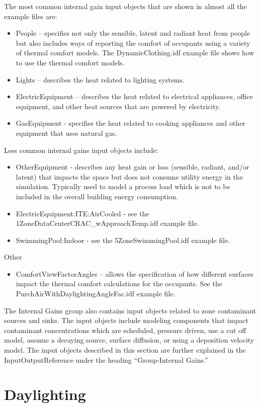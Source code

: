 The most common internal gain input objects that are shown in almost
all the example files are:
\begin{itemize}
\item People -- specifies not only the sensible, latent and radiant heat
from people but also includes ways of reporting the comfort of occupants
using a variety of thermal comfort models. The DynamicClothing.idf
example file shows how to use the thermal comfort models.
\item Lights -- describes the heat related to lighting systems.
\item ElectricEquipment -- describes the heat related to electrical appliances,
office equipment, and other heat sources that are powered by electricity.
\item GasEquipment - specifies the heat related to cooking appliances and
other equipment that uses natural gas.
\end{itemize}
Less common internal gains input objects include:
\begin{itemize}
\item OtherEquipment - describes any heat gain or loss (sensible, radiant,
and/or latent) that impacts the space but does not consume utility
energy in the simulation. Typically used to model a process load which
is not to be included in the overall building energy consumption.
\item ElectricEquipment:ITE:AirCooled - see the 1ZoneDataCenterCRAC\_wApproachTemp.idf
example file.
\item SwimmingPool:Indoor - see the 5ZoneSwimmingPool.idf example file.
\end{itemize}
Other
\begin{itemize}
\item ComfortViewFactorAngles -- allows the specification of how different
surfaces impact the thermal comfort calculations for the occupants.
See the PurchAirWithDaylightingAngleFac.idf example file.
\end{itemize}
The Internal Gains group also contains input objects related to zone
contaminant sources and sinks. The input objects include modeling
components that impact contaminant concentrations which are scheduled,
pressure driven, use a cut off model, assume a decaying source, surface
diffusion, or using a deposition velocity model. The input objects
described in this section are further explained in the InputOutputReference
under the heading ``Group-Internal Gains.''

\section{Daylighting }

